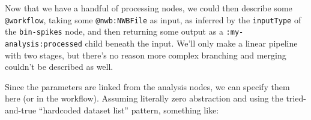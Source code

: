 \begin{Shaded}
\begin{Highlighting}[]

\OperatorTok{=}\OperatorTok{=}\OperatorTok{=}\NormalTok{)}

  \NormalTok{) }\OperatorTok{{-}\textgreater{}}
    \NormalTok{)}

  \NormalTok{, }\NormalTok{:}\NormalTok{) }\OperatorTok{{-}\textgreater{}} \NormalTok{:}
\end{Highlighting}
\end{Shaded}

Now that we have a handful of processing nodes, we could then describe
some \texttt{@workflow}, taking some \texttt{@nwb:NWBFile} as input, as
inferred by the \texttt{inputType} of the \texttt{bin-spikes} node, and
then returning some output as a \texttt{:my-analysis:processed} child
beneath the input. We'll only make a linear pipeline with two stages,
but there's no reason more complex branching and merging couldn't be
described as well.

\begin{Shaded}
\begin{Highlighting}[]



\end{Highlighting}
\end{Shaded}

Since the parameters are linked from the analysis nodes, we can specify
them here (or in the workflow). Assuming literally zero abstraction and
using the tried-and-true ``hardcoded dataset list'' pattern, something
like:

